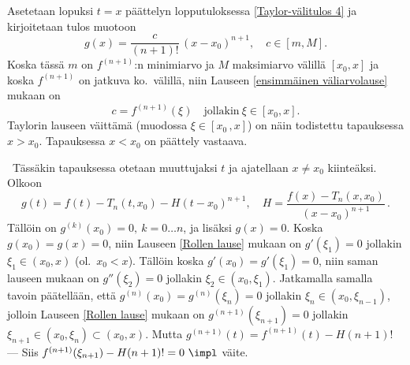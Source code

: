Asetetaan lopuksi $t=x$ päättelyn lopputuloksessa \eqref{Taylor-välitulos 4} ja kirjoitetaan
tulos muotoon
\[
g(x)=\frac{c}{(n+1)!}\,(x-x_0)^{n+1},\quad c\in [m,M].
\]
Koska tässä $m$ on $f^{(n+1)}$:n minimiarvo ja $M$ maksimiarvo välillä $[x_0,x]$ ja koska 
$f^{(n+1)}$ on jatkuva ko.\ välillä, niin Lauseen \ref{ensimmäinen väliarvolause} mukaan on
\[
c=f^{(n+1)}(\xi) \quad \text{jollakin}\ \xi\in [x_0,x].
\]
Taylorin lauseen väittämä (muodossa $\xi\in[x_0\,,x]$) on näin todistettu tapauksessa $x>x_0$.
Tapauksessa $x<x_0$ on päättely vastaava. \loppu

\vspace{0.5cm}
\underline{} \ Tässäkin tapauksessa otetaan muuttujaksi $t$ ja ajatellaan
$x \neq x_0$ kiinteäksi. Olkoon
\[
g(t) = f(t) - T_n(t,x_0) - H(t-x_0)^{n+1}, \quad H = \frac{f(x)-T_n(x,x_0)}{(x-x_0)^{n+1}}\,. 
\]
Tällöin on $g^{(k)}(x_0)=0,\ k=0 \ldots n$, ja lisäksi $g(x)=0$. Koska $g(x_0)=g(x)=0$,
niin Lauseen \ref{Rollen lause} mukaan on $g'(\xi_1)=0$ jollakin $\xi_1 \in (x_0,x)$ 
(ol.\ $x_0<x$). Tällöin koska $g'(x_0)=g'(\xi_1)=0$, niin saman lauseen mukaan on
$g''(\xi_2)=0$ jollakin $\xi_2 \in (x_0,\xi_1)$. Jatkamalla samalla tavoin päätellään, että 
$g^{(n)}(x_0)=g^{(n)}(\xi_n)=0$ jollakin $\xi_n \in (x_0,\xi_{n-1})$, jolloin Lauseen 
\ref{Rollen lause} mukaan on $g^{(n+1)}(\xi_{n+1})=0$ jollakin 
$\xi_{n+1} \in (x_0,\xi_n) \subset (x_0,x)$. Mutta $g^{(n+1)}(t) = f^{(n+1)}(t)-H(n+1)!$
--- Siis $f^{(n+1)}(\xi_{n+1})-H(n+1)!=0\ \impl$ väite. \loppu